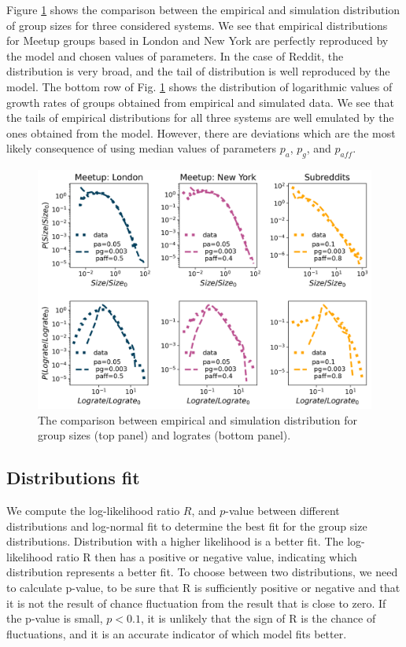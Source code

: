 Figure \ref{fig:fig6} shows the comparison between the empirical and simulation distribution of group sizes for three considered systems. We see that empirical distributions for Meetup groups based in London and New York are perfectly reproduced by the model and chosen values of parameters. In the case of Reddit, the distribution is very broad, and the tail of distribution is well reproduced by the model.
The bottom row of Fig. \ref{fig:fig6} shows the distribution of logarithmic values of growth rates of groups obtained from empirical and simulated data. We see that the tails of empirical distributions for all three systems are well emulated by the ones obtained from the model. However, there are deviations which are the most likely consequence of using median values of parameters $p_{a}$, $p_{g}$, and $p_{aff}$.
\begin{figure}[h!]
	\centering
	\includegraphics[width=0.8\linewidth]{Figures/figures/Fig4.png}
	\caption{The comparison between empirical and simulation distribution for group sizes (top panel) and logrates (bottom panel).}
	\label{fig:fig6}
\end{figure}

\subsection{Distributions fit}

We compute the log-likelihood ratio $R$, and $p$-value between different distributions and log-normal fit \cite{clauset2009power} to determine the best fit for the group size distributions. Distribution with a higher likelihood is a better fit. The log-likelihood ratio R then has a positive or negative value, indicating which distribution represents a better fit. To choose between two distributions, we need to calculate p-value,  to be sure that R is sufficiently positive or negative and that it is not the result of chance fluctuation from the result that is close to zero. If the p-value is small, $p<0.1$, it is unlikely that the sign of R is the chance of fluctuations, and it is an accurate indicator of which model fits better. \\


